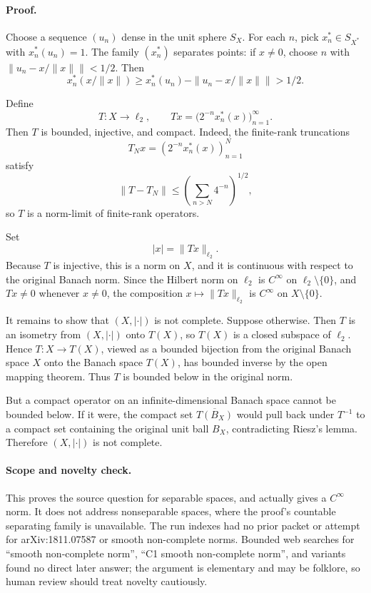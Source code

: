 \documentclass[11pt]{article}
\newcommand{\ellTwo}{\ell_2}
\begin{document}
\paragraph{Proof.}
Choose a sequence \((u_n)\) dense in the unit sphere \(S_X\).  For each
\(n\), pick \(x_n^*\in S_{X^*}\) with \(x_n^*(u_n)=1\).  The family
\((x_n^*)\) separates points: if \(x\ne0\), choose \(n\) with
\(\|u_n-x/\|x\|\|<1/2\).  Then
\[
x_n^*(x/\|x\|)\ge x_n^*(u_n)-\|u_n-x/\|x\|\|>1/2.
\]

Define
\[
T:X\longrightarrow \ellTwo,\qquad
Tx=\bigl(2^{-n}x_n^*(x)\bigr)_{n=1}^{\infty}.
\]
Then \(T\) is bounded, injective, and compact.  Indeed, the finite-rank
truncations
\[
T_Nx=(2^{-n}x_n^*(x))_{n=1}^N
\]
satisfy
\[
\|T-T_N\|\le
\left(\sum_{n>N}4^{-n}\right)^{1/2},
\]
so \(T\) is a norm-limit of finite-rank operators.

Set
\[
|x|=\|Tx\|_{\ellTwo}.
\]
Because \(T\) is injective, this is a norm on \(X\), and it is continuous
with respect to the original Banach norm.  Since the Hilbert norm on
\(\ellTwo\) is \(C^\infty\) on \(\ellTwo\setminus\{0\}\), and \(Tx\ne0\)
whenever \(x\ne0\), the composition \(x\mapsto\|Tx\|_{\ellTwo}\) is
\(C^\infty\) on \(X\setminus\{0\}\).

It remains to show that \((X,|\cdot|)\) is not complete.  Suppose otherwise.
Then \(T\) is an isometry from \((X,|\cdot|)\) onto \(T(X)\), so \(T(X)\)
is a closed subspace of \(\ellTwo\).  Hence \(T:X\to T(X)\), viewed as a
bounded bijection from the original Banach space \(X\) onto the Banach space
\(T(X)\), has bounded inverse by the open mapping theorem.  Thus \(T\) is
bounded below in the original norm.

But a compact operator on an infinite-dimensional Banach space cannot be
bounded below.  If it were, the compact set \(\overline{T(B_X)}\) would pull
back under \(T^{-1}\) to a compact set containing the original unit ball
\(B_X\), contradicting Riesz's lemma.  Therefore \((X,|\cdot|)\) is not
complete.

\paragraph{Scope and novelty check.}
This proves the source question for separable spaces, and actually gives a
\(C^\infty\) norm.  It does not address nonseparable spaces, where the proof's
countable separating family is unavailable.  The run indexes had no prior
packet or attempt for arXiv:1811.07587 or smooth non-complete norms.  Bounded
web searches for ``smooth non-complete norm'', ``C1 smooth non-complete
norm'', and variants found no direct later answer; the argument is elementary
and may be folklore, so human review should treat novelty cautiously.
\end{document}
